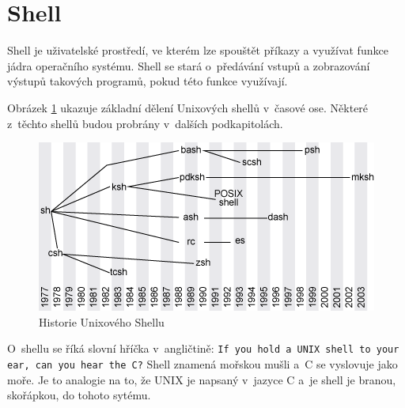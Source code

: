 \documentclass[thesis=M,czech]{FITthesis}[2012/06/26]
\begin{document}




\section{Shell}

Shell je uživatelské prostředí, ve kterém lze spouštět příkazy a využívat funkce jádra operačního systému. Shell se stará o~předávání vstupů a zobrazování výstupů takových programů, pokud této funkce využívají.

Obrázek \ref{fig:shell_history} ukazuje základní dělení Unixových shellů v~časové ose. Některé z~těchto shellů budou probrány v~dalších podkapitolách.

\begin{figure}[htb]\centering
	\includegraphics[width=\textwidth]{./images/tmp_shell_history}
	\caption{Historie Unixového Shellu}
	\label{fig:shell_history}
\end{figure}

O~shellu se říká slovní hříčka v~angličtině: \texttt{If you hold a UNIX shell to your ear, can you hear the C?} Shell znamená mořskou mušli a~C se vyslovuje jako moře. Je to analogie na to, že UNIX je napsaný v~jazyce C a~je shell je branou, skořápkou, do tohoto sytému.


\end{document}
